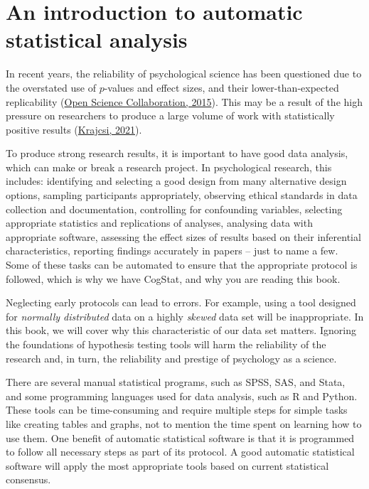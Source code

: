 \documentclass[
]{book}
\theoremstyle{definition}
\theoremstyle{definition}
\theoremstyle{definition}
\theoremstyle{definition}
\theoremstyle{remark}
\begin{document}
\hypertarget{autostat}{%
\chapter{An introduction to automatic statistical analysis}\label{autostat}}

In recent years, the reliability of psychological science has been questioned due to the overstated use of \(p\)-values and effect sizes, and their lower-than-expected replicability (\protect\hyperlink{ref-open_science_collaboration_estimating_2015}{Open Science Collaboration, 2015}). This may be a result of the high pressure on researchers to produce a large volume of work with statistically positive results (\protect\hyperlink{ref-krajcsi_advancing_2021}{Krajcsi, 2021}).

To produce strong research results, it is important to have good data analysis, which can make or break a research project. In psychological research, this includes: identifying and selecting a good design from many alternative design options, sampling participants appropriately, observing ethical standards in data collection and documentation, controlling for confounding variables, selecting appropriate statistics and replications of analyses, analysing data with appropriate software, assessing the effect sizes of results based on their inferential characteristics, reporting findings accurately in papers -- just to name a few. Some of these tasks can be automated to ensure that the appropriate protocol is followed, which is why we have CogStat, and why you are reading this book.

Neglecting early protocols can lead to errors. For example, using a tool designed for \emph{normally distributed} data on a highly \emph{skewed} data set will be inappropriate. In this book, we will cover why this characteristic of our data set matters. Ignoring the foundations of hypothesis testing tools will harm the reliability of the research and, in turn, the reliability and prestige of psychology as a science.

There are several manual statistical programs, such as SPSS, SAS, and Stata, and some programming languages used for data analysis, such as R and Python. These tools can be time-consuming and require multiple steps for simple tasks like creating tables and graphs, not to mention the time spent on learning how to use them. One benefit of automatic statistical software is that it is programmed to follow all necessary steps as part of its protocol. A good automatic statistical software will apply the most appropriate tools based on current statistical consensus.
\end{document}
